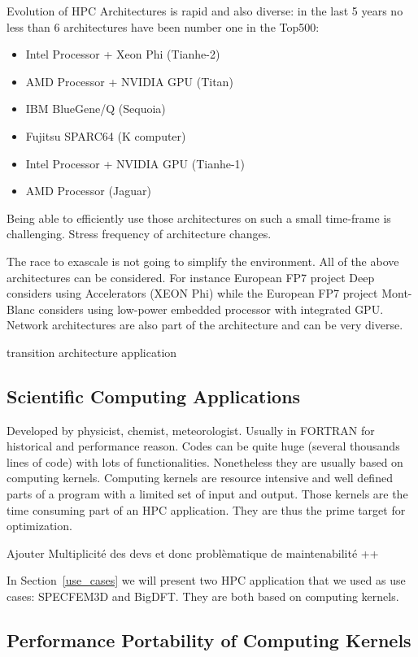 \documentclass[review]{elsarticle}
\begin{document}
Evolution of HPC Architectures is rapid and also diverse: in the last 5
years no less than 6 architectures have been number one in the Top500:
\begin{itemize}
\item Intel Processor + Xeon Phi (Tianhe-2)
\item AMD Processor + NVIDIA GPU (Titan)
\item IBM BlueGene/Q (Sequoia)
\item Fujitsu SPARC64 (K computer)
\item Intel Processor + NVIDIA GPU (Tianhe-1)
\item AMD Processor (Jaguar)
\end{itemize}
Being able to efficiently use those architectures on such a small
time-frame is challenging. Stress frequency of architecture changes.

The race to exascale is not going to simplify the environment. All of the
above architectures can be considered. For instance European FP7 project Deep
considers using Accelerators (XEON Phi) while the European FP7 project
Mont-Blanc considers using low-power embedded processor with integrated
GPU. Network architectures are also part of the architecture and can be
very diverse.

transition architecture application

  \subsection{Scientific Computing Applications}

Developed by physicist, chemist, meteorologist. Usually in FORTRAN for
historical and performance reason. Codes can be quite huge (several
thousands lines of code) with lots of functionalities. Nonetheless they are
usually based on computing kernels. Computing kernels are resource
intensive and well defined parts of a program with a limited set of input
and output. Those kernels are the time consuming part of an HPC
application. They are thus the prime target for optimization.

Ajouter Multiplicité des devs et donc problèmatique de maintenabilité ++

In Section~\ref{use_cases} we will present two HPC application that we used
as use cases: SPECFEM3D and BigDFT. They are both based on computing
kernels.

  \subsection{Performance Portability of Computing Kernels}
\end{document}
